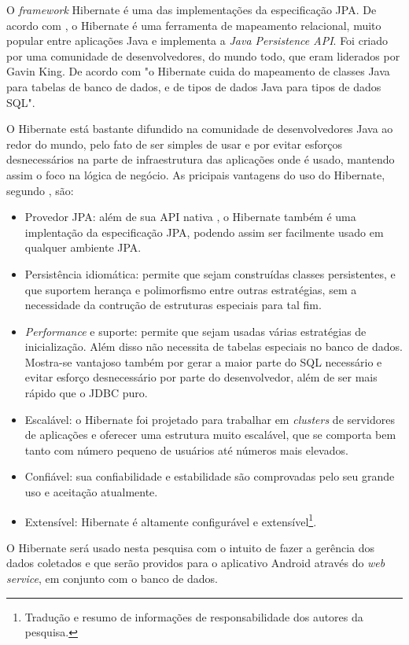 	\par O \textit{framework} Hibernate é uma das implementações da especificação
JPA. De acordo com , o Hibernate é
uma ferramenta de mapeamento relacional, muito popular entre aplicações
Java e implementa a \textit{Java Persistence API}. Foi criado por uma
comunidade de desenvolvedores, do mundo todo, que eram liderados por Gavin King.
De acordo com  "o Hibernate cuida do mapeamento
de classes Java para tabelas de banco de dados, e de tipos de dados
Java para tipos de dados SQL".

	\par O Hibernate está bastante difundido na comunidade de desenvolvedores Java
ao redor do mundo, pelo fato de ser simples de usar e por evitar esforços
desnecessários na parte de infraestrutura das aplicações onde é usado, mantendo
assim o foco na lógica de negócio. As pricipais vantagens do uso do Hibernate,
segundo , são:

	\begin{itemize}
	  
		\item Provedor JPA: além de sua API nativa , o Hibernate também é uma
		implentação da especificação JPA, podendo assim ser facilmente usado em
		qualquer ambiente JPA.
		  		
		\item Persistência idiomática: permite que sejam construídas classes
		persistentes, e que suportem herança e polimorfismo entre outras estratégias,
		sem a necessidade da contrução de estruturas especiais para tal fim.
			  	
		\item \textit{Performance} e suporte: permite que sejam usadas várias
		estratégias de inicialização. Além disso não necessita de tabelas especiais
		no banco de dados. Mostra-se vantajoso também por gerar a maior parte do SQL
		necessário e evitar esforço desnecessário por parte do desenvolvedor, além de
		ser mais rápido que o JDBC puro.
		  
		\item Escalável: o Hibernate foi projetado para trabalhar em
		\textit{clusters} de servidores de aplicações e oferecer uma estrutura muito
		escalável, que se comporta bem tanto com número pequeno de usuários até
		números mais elevados.
	
		\item Confiável: sua confiabilidade e estabilidade são comprovadas pelo seu
		grande uso e aceitação atualmente.
				
		\item Extensível: Hibernate é altamente configurável e
		extensível\footnote{Tradução e resumo de informações de responsabilidade dos
		autores da pesquisa.}.
	
	\end{itemize}
	
	\par O Hibernate será usado nesta pesquisa com o intuito de fazer a
gerência dos dados coletados e que serão providos para o aplicativo
Android através do \textit{web service}, em conjunto com o banco de
dados.